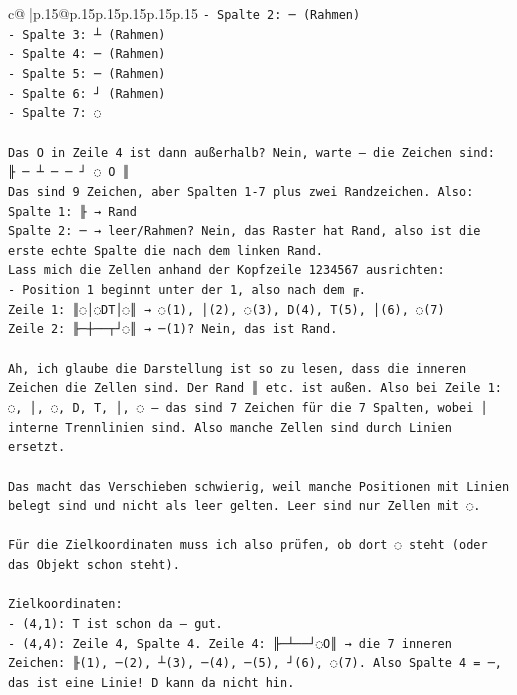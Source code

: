 \documentclass{article}
\begin{document}
{\begin{supertabular}{c@{$\;$}|p{.15\linewidth}@{}p{.15\linewidth}p{.15\linewidth}p{.15\linewidth}p{.15\linewidth}p{.15\linewidth}}
{{{\texttt{{-} Spalte 2: ─ (Rahmen)} \\
\texttt{{-} Spalte 3: ┴ (Rahmen)} \\
\texttt{{-} Spalte 4: ─ (Rahmen)} \\
\texttt{{-} Spalte 5: ─ (Rahmen)} \\
\texttt{{-} Spalte 6: ┘ (Rahmen)} \\
\texttt{{-} Spalte 7: ◌} \\
\\ 
\texttt{Das O in Zeile 4 ist dann außerhalb? Nein, warte – die Zeichen sind:} \\
\texttt{╟ ─ ┴ ─ ─ ┘ ◌ O ║} \\
\texttt{Das sind 9 Zeichen, aber Spalten 1{-}7 plus zwei Randzeichen. Also:} \\
\texttt{Spalte 1: ╟ → Rand} \\
\texttt{Spalte 2: ─ → leer/Rahmen? Nein, das Raster hat Rand, also ist die erste echte Spalte die nach dem linken Rand.} \\
\texttt{Lass mich die Zellen anhand der Kopfzeile  1234567 ausrichten:} \\
\texttt{{-} Position 1 beginnt unter der 1, also nach dem ╔. } \\
\texttt{Zeile 1: ║◌│◌DT│◌║ → ◌(1), │(2), ◌(3), D(4), T(5), │(6), ◌(7)} \\
\texttt{Zeile 2: ╟─┼──┬┘◌║ → ─(1)? Nein, das ist Rand.} \\
\\ 
\texttt{Ah, ich glaube die Darstellung ist so zu lesen, dass die inneren Zeichen die Zellen sind. Der Rand ║ etc. ist außen. Also bei Zeile 1: ◌, │, ◌, D, T, │, ◌ – das sind 7 Zeichen für die 7 Spalten, wobei │ interne Trennlinien sind. Also manche Zellen sind durch Linien ersetzt.} \\
\\ 
\texttt{Das macht das Verschieben schwierig, weil manche Positionen mit Linien belegt sind und nicht als leer gelten. Leer sind nur Zellen mit ◌.} \\
\\ 
\texttt{Für die Zielkoordinaten muss ich also prüfen, ob dort ◌ steht (oder das Objekt schon steht).} \\
\\ 
\texttt{Zielkoordinaten:} \\
\texttt{{-} (4,1): T ist schon da – gut.} \\
\texttt{{-} (4,4): Zeile 4, Spalte 4. Zeile 4: ╟─┴──┘◌O║ → die 7 inneren Zeichen: ╟(1), ─(2), ┴(3), ─(4), ─(5), ┘(6), ◌(7). Also Spalte 4 = ─, das ist eine Linie! D kann da nicht hin.} \\
}}}
\end{supertabular}}
\end{document}
